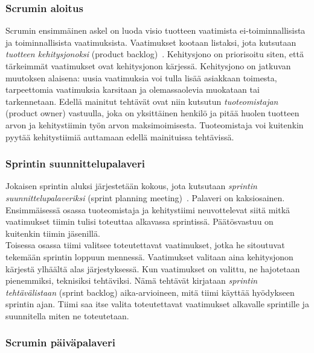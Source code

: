 \documentclass[finnish]{../tktltiki2}
\theoremstyle{definition}
\theoremstyle{remark}
\begin{document}
\subsubsection{Scrumin aloitus}

Scrumin ensimmäinen askel on luoda visio tuotteen vaatimista
ei-toiminnalli\-sista ja toiminnallisista vaatimuksista. Vaatimukset
kootaan listaksi, jota kutsutaan \emph{tuotteen kehitysjonoksi} (product backlog)~\cite{ScrumFinnishGuide}. Kehitysjono on priorisoitu siten, että tärkeimmät vaatimukset ovat kehitysjonon kärjessä. Kehitysjono on jatkuvan muutoksen alaisena: uusia vaatimuksia
voi tulla lisää asiakkaan toimesta, tarpeettomia vaatimuksia karsitaan ja olemassaolevia muokataan tai tarkennetaan. Edellä mainitut tehtävät
ovat niin kutsutun \emph{tuoteomistajan} (product owner) vastuulla,
joka on yksittäinen henkilö ja pitää huolen tuotteen arvon ja kehitystiimin työn arvon maksimoimisesta. Tuoteomistaja voi kuitenkin pyytää kehitystiimiä auttamaan edellä mainituissa tehtävissä.

\subsubsection{Sprintin suunnittelupalaveri}

Jokaisen sprintin aluksi järjestetään kokous, jota kutsutaan \emph{sprintin suunnittelupalaveriksi} (sprint planning meeting)~\cite{ScrumHandBook}. Palaveri on kaksiosainen.
Ensimmäisessä osassa tuoteomistaja ja kehitystiimi neuvottelevat
siitä mitkä vaatimukset tiimin tulisi toteuttaa alkavassa
sprintissä. Päätösvastuu on kuitenkin tiimin jäsenillä.\\

Toisessa osassa tiimi valitsee toteutettavat vaatimukset, jotka
he sitoutuvat tekemään sprintin loppuun mennessä. Vaatimukset
valitaan aina kehitysjonon kärjestä ylhäältä alas järjestyksessä.
Kun vaatimukset on valittu, ne hajotetaan pienemmiksi, teknisiksi
tehtäviksi. Nämä tehtävät kirjataan \emph{sprintin tehtävälistaan} (sprint backlog) aika-arvioineen, mitä tiimi käyttää hyödykseen sprintin ajan. Tiimi saa itse valita toteutettavat vaatimukset alkavalle sprintille ja suunnitella miten ne toteutetaan.

\subsubsection{Scrumin päiväpalaveri}
\end{document}
